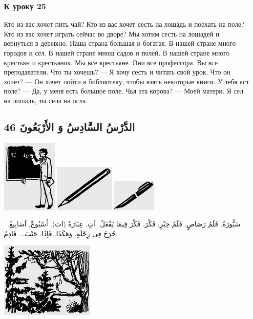 \documentclass[a5paper]{article}
\begin{document}
\subsubsection{К уроку 25}
Кто из вас хочет пить чай? Кто из вас хочет сесть на лошадь и поехать на поле? Кто из вас хочет играть сейчас во дворе? Мы хотим сесть на лошадей и вернуться в деревню. Наша страна большая и богатая. В нашей стране много городов и сёл. В нашей стране мнош садов и полей. В нашей стране много крестьян и крестьянок. Мы все крестьяне. Они все профессора. Вы все преподаватели. Что ты хочешь? — Я хочу сесть и читать свой урок. Что он хочет? — Он хочет пойти в библиотеку, чтобы взять некоторые книги. У тебя ест поле? — Да, у меня есть большое поле. Чья эта корова? — Моей матери. Я сел на лошадь, ты села на осла.

\subsection{الدَّرْسُ السَّادِسُ وَ الأَرْبَعُونَ 46}
 \includegraphics[width=1.0835in,height=1.448in]{MuhammadBagauddinlatinized-img145.png}   \includegraphics[width=1.1665in,height=0.9272in]{MuhammadBagauddinlatinized-img146.png}   \includegraphics[width=0.8646in,height=0.6252in]{MuhammadBagauddinlatinized-img147.png} 

\ سَبُّورَةٌ. قَلَمُ رَصَاصٍ. قَلَمُ حِبْرٍ. فَكَّرَ. فَكَّرَ فِيمَا يَفْعَلُ. آتٍ. عِبَارَةٌ (ات). اُسْبُوعٌ, اَسَابِيعُ. خَرَخَ فِى رِحْلَةٍ. وَهَكَذَا. فَاِذَا. جَنْبَ... قَادِمٌ. 

 \includegraphics[width=1.8335in,height=1.4898in]{MuhammadBagauddinlatinized-img148.png} 
\end{document}
